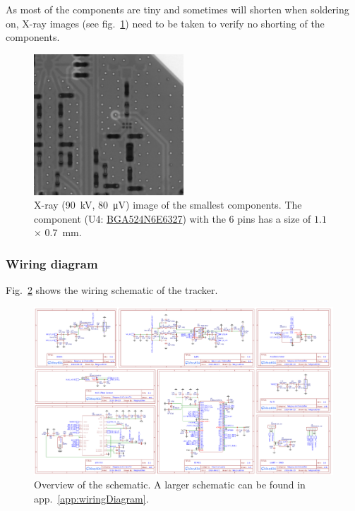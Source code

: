 As most of the components are tiny and sometimes will shorten when soldering on, X-ray images (see fig.~\ref{fig:x_ray}) need to be taken to verify no shorting of the components.

\begin{figure}[H]
    \centering
    \includegraphics[width=0.5\textwidth]{figures/x_ray.jpg}
    \caption{X-ray (\SI{90}{\kilo\volt}, \SI{80}{\micro\volt}) image of the smallest components. The component (U4: \hyperref[bom:bga524n6e6327]{BGA524N6E6327}) with the 6 pins has a size of $1.1$ × \SI{0.7}{\milli\meter}.}
    \label{fig:x_ray}
\end{figure}

\subsubsection{Wiring diagram}
Fig.~\ref{fig:schematic} shows the wiring schematic of the tracker.

\begin{figure}[H]
    \centering
    \includegraphics[width=1\textwidth]{figures/Schematic.pdf}
    \caption{Overview of the schematic. A larger schematic can be found in app.~\ref{app:wiringDiagram}.}
    \label{fig:schematic}
\end{figure}

